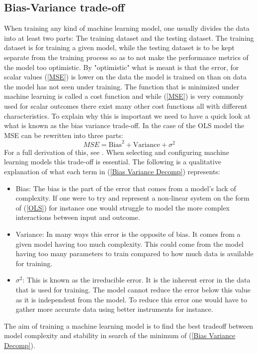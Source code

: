 \subsection{Bias-Variance trade-off}
\label{Bias-Variance trade-off}
When training any kind of machine learning model, one usually divides the data 
into at least two parts: The training dataset and the testing dataset. The training 
dataset is for training a given model, while the testing dataset is to be kept separate 
from the training process so as to not make the performance metrics of the model too optimistic. 
By "optimistic" what is meant is that the error, for scalar values (\ref{MSE}) is 
lower on the data the model is trained on than on data the model has not seen under 
training. The function that is minimized under machine learning is called a 
cost function and while (\ref{MSE}) is very commonly used for scalar outcomes 
there exist many other cost functions all with different characteristics. \citationneeded
To explain 
why this is important we need to have a quick look at what is known as the 
bias variance trade-off.
In the case of the OLS model the MSE can be rewritten into three parts:
\begin{equation}
    MSE = \text{Bias}^2 + \text{Variance} + \sigma^2
    \label{Bias Variance Decomp}
\end{equation}
For a full derivation of this, see \cite{vijayakumar2007bias}. When selecting and 
configuring machine learning models this trade-off is essential. The following is 
a qualitative explanation of what each term in (\ref{Bias Variance Decomp})
represents:
\begin{itemize}
\item Bias: The bias is the part of the error that comes from a model's lack of complexity.  If one were to try and represent a non-linear system on the form of (\ref{OLS}) for instance one would struggle to model the more complex interactions between input and outcome.
\item Variance: In many ways this error is the opposite of bias. It comes from a given model having too much complexity. This could come from the model having too many parameters to train compared to how much data is available for training. 
\item $\sigma^2$: This is known as the irreducible error. It is the inherent error in the data that is used for training. The model cannot reduce the error below this value as it is independent from the model. To reduce this error one would have to gather more accurate data using better instruments for instance. 
\end{itemize}
The aim of training a machine learning model is to find the best tradeoff between model
complexity and stability in search of the minimum of (\ref{Bias Variance Decomp}).
